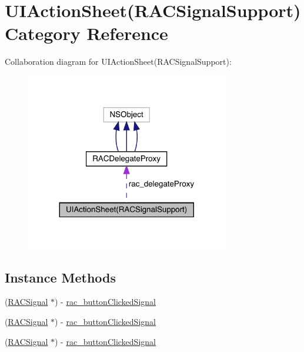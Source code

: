 \hypertarget{category_u_i_action_sheet_07_r_a_c_signal_support_08}{}\section{U\+I\+Action\+Sheet(R\+A\+C\+Signal\+Support) Category Reference}
\label{category_u_i_action_sheet_07_r_a_c_signal_support_08}


Collaboration diagram for U\+I\+Action\+Sheet(R\+A\+C\+Signal\+Support)\+:\nopagebreak
\begin{figure}[H]
\begin{center}
\leavevmode
\includegraphics[width=251pt]{category_u_i_action_sheet_07_r_a_c_signal_support_08__coll__graph}
\end{center}
\end{figure}
\subsection*{Instance Methods}
\begin{DoxyCompactItemize}
\item 
(\mbox{\hyperlink{interface_r_a_c_signal}{R\+A\+C\+Signal}} $\ast$) -\/ \mbox{\hyperlink{category_u_i_action_sheet_07_r_a_c_signal_support_08_a0b67dde5b07b850d24d70d030c80dd1b}{rac\+\_\+button\+Clicked\+Signal}}
\item 
(\mbox{\hyperlink{interface_r_a_c_signal}{R\+A\+C\+Signal}} $\ast$) -\/ \mbox{\hyperlink{category_u_i_action_sheet_07_r_a_c_signal_support_08_a0b67dde5b07b850d24d70d030c80dd1b}{rac\+\_\+button\+Clicked\+Signal}}
\item 
(\mbox{\hyperlink{interface_r_a_c_signal}{R\+A\+C\+Signal}} $\ast$) -\/ \mbox{\hyperlink{category_u_i_action_sheet_07_r_a_c_signal_support_08_a0b67dde5b07b850d24d70d030c80dd1b}{rac\+\_\+button\+Clicked\+Signal}}
\end{DoxyCompactItemize}
